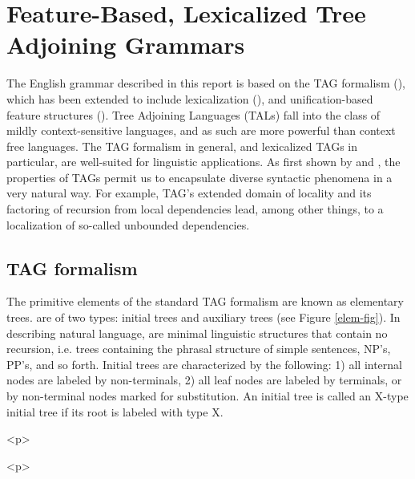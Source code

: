 \chapter{Feature-Based, Lexicalized Tree Adjoining Grammars} 
\label{intro-FBLTAG} 
 
The English grammar described in this report is based on the TAG formalism 
(\cite{joshi75}), which has been extended to include lexicalization 
(\cite{schabes88}), and unification-based feature structures 
(\cite{vijay91}). Tree Adjoining Languages (TALs) fall into the class of mildly 
context-sensitive languages, and as such are more powerful than context free 
languages.  The TAG formalism in general, and lexicalized TAGs in particular, 
are well-suited for linguistic applications.  As first shown by \cite{joshi85} 
and \cite{kj87}, the properties of TAGs permit us to encapsulate diverse 
syntactic phenomena in a very natural way.  For example, TAG's extended domain 
of locality and its factoring of recursion from local dependencies lead, among 
other things, to a localization of so-called unbounded dependencies. 
 
\section{TAG formalism} 
 
The primitive elements of the standard TAG formalism are known as elementary 
trees.   are of two types: initial trees and 
auxiliary trees (see Figure \ref{elem-fig}).  In describing natural language, 
 are minimal linguistic structures that contain no 
recursion, i.e. trees containing the phrasal structure of simple sentences, 
NP's, PP's, and so forth.  Initial trees are characterized by the following: 1) 
all internal nodes are labeled by non-terminals, 2) all leaf nodes are labeled 
by terminals, or by non-terminal nodes marked for substitution. An initial tree 
is called an X-type initial tree if its root is labeled with type X. 
 
\begin{rawhtml} <p> \end{rawhtml}
\centering 
{} 
\begin{rawhtml} <dl> <dt>{Elementary trees in TAG <p> </dl> \end{rawhtml}
\label{elem-fig} 
\begin{rawhtml} <p> \end{rawhtml}
 
